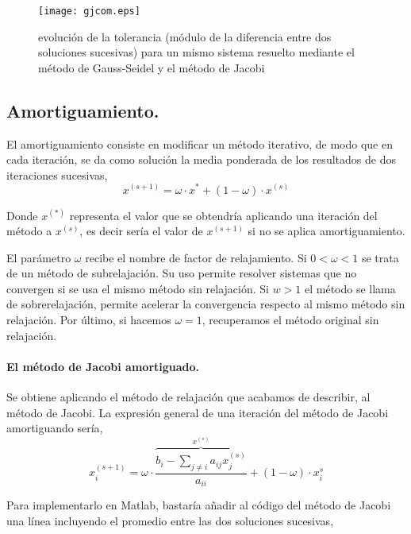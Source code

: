\begin{figure}[h]
\centering
\texttt{[image: gjcom.eps]}
\caption{evolución de la tolerancia (módulo de la diferencia entre dos soluciones sucesivas) para un mismo sistema resuelto mediante el método de Gauss-Seidel y el método de Jacobi}
\label{fig:gjcom}
\end{figure}

\subsection{Amortiguamiento.}  El amortiguamiento consiste en modificar un método iterativo, de modo que en cada iteración, se da como solución la media ponderada de los resultados de dos iteraciones sucesivas,
\begin{equation*}
x^{(s+1)}=\omega \cdot x^{*}+(1-\omega) \cdot x^{(s)}
\end{equation*}

Donde $x^{(*)}$ representa el valor que se obtendría aplicando una iteración del método a $x^{(s)}$, es decir sería el valor de $x^{(s+1)}$ si no se aplica amortiguamiento.

El parámetro $\omega$ recibe el nombre de factor de relajamiento. Si $0<\omega<1$ se trata de un método de subrelajación. Su uso permite resolver sistemas que no convergen si se usa el mismo método sin relajación. Si $w>1$ el método se llama de sobrerelajación, permite acelerar la convergencia respecto al mismo método sin relajación. Por último, si hacemos $\omega=1$, recuperamos el método original sin relajación.

\paragraph{El método de Jacobi amortiguado.}  Se obtiene aplicando el método de relajación que acabamos de describir, al método de Jacobi. La expresión general de una iteración del método de Jacobi amortiguando sería,
\begin{equation*}
x_i^{(s+1)}=\omega\cdot \overbrace{\frac{b_i-\sum_{j\neq i}a_{ij}x_j^{(s)}}{a_{ii}}}^{x^{(*)}}+(1- \omega)\cdot x_i^{s}
\end{equation*}

Para implementarlo en Matlab, bastaría añadir al código del método de Jacobi una línea incluyendo el promedio entre las dos soluciones sucesivas,

